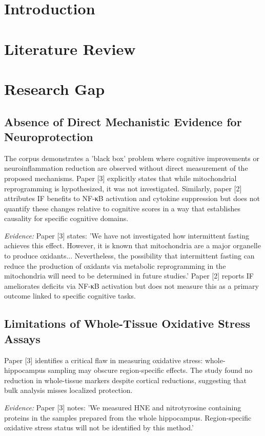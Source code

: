 \documentclass[11pt]{article}
\begin{document}
\section{Introduction}
\section{Literature Review}
\section{Research Gap}
\subsection{Absence of Direct Mechanistic Evidence for Neuroprotection}
The corpus demonstrates a 'black box' problem where cognitive improvements or neuroinflammation reduction are observed without direct measurement of the proposed mechanisms. Paper [3] explicitly states that while mitochondrial reprogramming is hypothesized, it was not investigated. Similarly, paper [2] attributes IF benefits to NF-κB activation and cytokine suppression but does not quantify these changes relative to cognitive scores in a way that establishes causality for specific cognitive domains.

\textit{Evidence:} Paper [3] states: 'We have not investigated how intermittent fasting achieves this effect. However, it is known that mitochondria are a major organelle to produce oxidants... Nevertheless, the possibility that intermittent fasting can reduce the production of oxidants via metabolic reprogramming in the mitochondria will need to be determined in future studies.' Paper [2] reports IF ameliorates deficits via NF-κB activation but does not measure this as a primary outcome linked to specific cognitive tasks.

\subsection{Limitations of Whole-Tissue Oxidative Stress Assays}
Paper [3] identifies a critical flaw in measuring oxidative stress: whole-hippocampus sampling may obscure region-specific effects. The study found no reduction in whole-tissue markers despite cortical reductions, suggesting that bulk analysis misses localized protection.

\textit{Evidence:} Paper [3] notes: 'We measured HNE and nitrotyrosine containing proteins in the samples prepared from the whole hippocampus. Region-specific oxidative stress status will not be identified by this method.'
\end{document}
